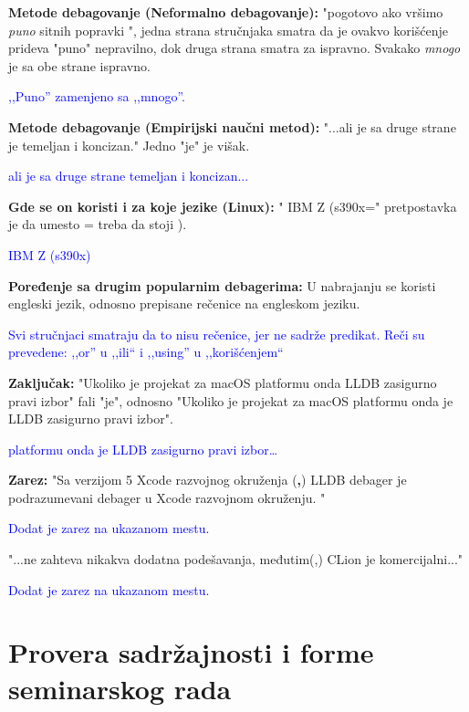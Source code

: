 \documentclass[a4paper]{report}
\newcommand{\odgovor}[1]{\textcolor{blue}{#1}}
\begin{document}
\textbf{Metode debagovanje (Neformalno debagovanje):} "pogotovo ako vršimo \textit{puno} sitnih popravki ", jedna strana stručnjaka smatra da je ovakvo korišćenje prideva
"puno" nepravilno, dok druga strana smatra za ispravno. Svakako \textit{mnogo} je sa obe strane ispravno.

\odgovor{,,Puno'' zamenjeno sa ,,mnogo''.}

\textbf{Metode debagovanje (Empirijski naučni metod):} "...ali je sa druge strane je temeljan i koncizan." Jedno "je"{} je višak.

\odgovor{ali je sa druge strane temeljan i koncizan...}

\textbf{Gde se on koristi i za koje jezike (Linux):} " IBM Z (s390x="{} pretpostavka je da umesto = treba da stoji ).

\odgovor{IBM Z (s390x)}

\textbf{Poređenje sa drugim popularnim debagerima: } U nabrajanju se koristi engleski jezik, odnosno prepisane rečenice na engleskom jeziku.

\odgovor{Svi stručnjaci smatraju da to nisu rečenice, jer ne sadrže predikat. Reči su prevedene: ,,or'' u ,,ili`` i ,,using'' u ,,korišćenjem``}

\textbf{Zaključak: } "Ukoliko je projekat za macOS platformu onda LLDB zasigurno pravi izbor"{} fali "je", odnosno "Ukoliko je projekat za macOS platformu onda je LLDB zasigurno pravi izbor".

\odgovor{platformu onda je LLDB zasigurno pravi izbor\ldots}

\textbf{Zarez: } "{}Sa verzijom 5 Xcode razvojnog okruženja (\textbf{,}) LLDB debager je podrazumevani debager u Xcode razvojnom okruženju. "

\odgovor{Dodat je zarez na ukazanom mestu.}

"...ne zahteva nikakva dodatna podešavanja, međutim(,) CLion je komercijalni..."

\odgovor{Dodat je zarez na ukazanom mestu.}
\section{Provera sadržajnosti i forme seminarskog rada}
\end{document}
